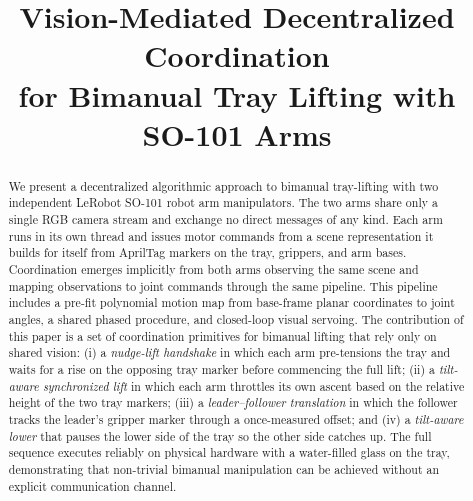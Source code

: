 \documentclass[conference]{IEEEtran}
\begin{document}
%
\title{Vision-Mediated Decentralized Coordination \\
for Bimanual Tray Lifting with \\
SO-101 Arms}


\author{
\and
{}
}




\maketitle
\begin{abstract}
We present a decentralized algorithmic approach to bimanual tray-lifting with two independent LeRobot SO-101 robot arm manipulators. The two arms share only a single RGB camera stream and exchange no direct messages of any kind. Each arm runs in its own thread and issues motor commands from a scene representation it builds for itself from AprilTag markers on the tray, grippers, and arm bases. Coordination emerges implicitly from both arms observing the same scene and mapping observations to joint commands through the same pipeline. This pipeline includes a pre-fit polynomial motion map from base-frame planar coordinates to joint angles, a shared phased procedure, and closed-loop visual servoing. The contribution of this paper is a set of coordination primitives for bimanual lifting that rely only on shared vision:
(i) a \emph{nudge-lift handshake} in which each arm pre-tensions the tray and waits for a rise on the opposing tray marker before commencing the full lift; (ii) a \emph{tilt-aware synchronized lift} in which each arm throttles its own ascent based on the relative height of the two tray markers; 
(iii) a \emph{leader--follower translation} in which the follower tracks the leader's gripper marker through a once-measured offset; and 
(iv) a \emph{tilt-aware lower} that pauses the lower side of the tray so the other side catches up. The full sequence executes reliably on physical hardware with a water-filled glass on the tray, demonstrating that
non-trivial bimanual manipulation can be achieved without an explicit communication channel.
\end{abstract}
\end{document}
